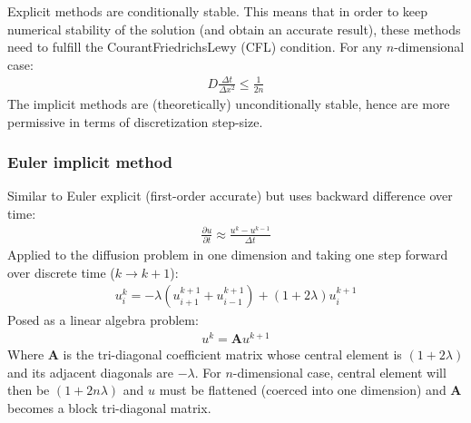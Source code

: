 \documentclass[letterpaper,10pt,english]{sphinxmanual}
\begin{document}
 Explicit methods are conditionally stable. This means that in
order to keep numerical stability of the solution (and obtain an
accurate result), these methods need to fulfill the
Courant\textendash{}Friedrichs\textendash{}Lewy (CFL) condition. For any \(n\)-dimensional
case:
\begin{equation*}
\begin{split}D\frac{\Delta t}{\Delta x^2}\leq\frac{1}{2n}\end{split}
\end{equation*}
The implicit methods are (theoretically) unconditionally stable, hence
are more permissive in terms of discretization step-size.


\subsubsection{Euler implicit method}
\label{\detokenize{diffusion:euler-implicit-method}}
Similar to Euler explicit (first-order accurate) but uses backward
difference over time:
\begin{equation*}
\begin{split}\frac{\partial u}{\partial t}\approx\frac{u^k-u^{k-1}}{\Delta t}\end{split}
\end{equation*}
Applied to the diffusion problem in one dimension and taking one step
forward over discrete time (\(k\rightarrow k+1\)):
\begin{equation*}
\begin{split}u_i^k=-\lambda\left(u_{i+1}^{k+1}+u_{i-1}^{k+1}\right)+\left(1+2  \lambda\right)u_i^{k+1}\end{split}
\end{equation*}
Posed as a linear algebra problem:
\begin{equation*}
\begin{split}u^{k}=\mathbf{A}u^{k+1}\end{split}
\end{equation*}
Where \(\mathbf{A}\) is the tri-diagonal coefficient matrix whose
central element is \((1+2\lambda)\) and its adjacent diagonals are
\(-\lambda\). For \(n\)-dimensional case, central element will
then be \((1+2n\lambda)\) and \(u\) must be flattened (coerced
into one dimension) and \(\mathbf{A}\) becomes a block tri-diagonal
matrix.
\end{document}

